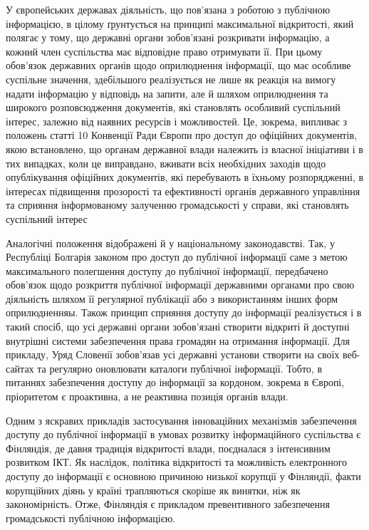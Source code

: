 У європейських державах діяльність, що пов’язана з роботою
з публічною інформацією, в цілому ґрунтується на принципі
максимальної відкритості, який полягає у тому, що державні органи
зобов’язані розкривати інформацію, а кожний член суспільства має
відповідне право отримувати її. При цьому обов’язок державних органів
щодо оприлюднення інформації, що має особливе суспільне значення,
здебільшого реалізується не лише як реакція на вимогу надати
інформацію у відповідь на запити, але й шляхом оприлюднення та
широкого розповсюдження документів, які становлять особливий
суспільний інтерес, залежно від наявних ресурсів і можливостей.
Це, зокрема, випливає з положень статті 10 Конвенції Ради Європи
про доступ до офіційних документів, якою встановлено, що органам
державної влади належить із власної ініціативи і в тих випадках, коли
це виправдано, вживати всіх необхідних заходів щодо опублікування
офіційних документів, які перебувають в їхньому розпорядженні, в
інтересах підвищення прозорості та ефективності органів державного
управління та сприяння інформованому залученню громадськості у
справи, які становлять суспільний інтерес

Аналогічні положення відображені й у національному законодавстві.
Так, у Республіці Болгарія законом про доступ до публічної інформації
саме з метою максимального полегшення доступу
до публічної інформації, передбачено обов’язок щодо
розкриття публічної інформації державними органами про свою
діяльність шляхом її регулярної публікації або з використанням
інших форм оприлюдненняы.
Також принцип сприяння доступу до
інформації реалізується і в такий спосіб, що усі державні органи
зобов’язані створити відкриті й доступні внутрішні
системи забезпечення права громадян на отримання інформації.
Для прикладу, Уряд Словенії зобов’язав усі державні установи створити на своїх
веб-сайтах та регулярно оновлювати каталоги публічної інформації.
Тобто, в питаннях забезпечення доступу до інформації за кордоном,
зокрема в Європі, пріоритетом є проактивна, а не реактивна позиція
органів влади.

Одним з яскравих прикладів застосування інноваційних механізмів
забезпечення доступу до публічної інформації в умовах розвитку
інформаційного суспільства є Фінляндія, де давня традиція
відкритості влади, поєдналася з інтенсивним розвитком ІКТ. Як
наслідок, політика відкритості та можливість електронного доступу
до інформації є основною причиною низької корупції у Фінляндії,
факти корупційних діянь у країні трапляються скоріше як винятки,
ніж як закономірність. Отже, Фінляндія є прикладом превентивного
забезпечення громадськості публічною інформацією.


